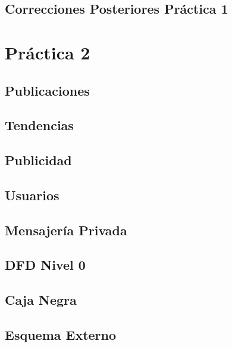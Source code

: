 \documentclass[twoside,openright,titlepage,numbers=noenddot,headinclude,footinclude=true,
cleardoublepage=empty,abstractoff,BCOR=5mm,paper=a4,fontsize=12pt,main=spanish,pdfstartpage=1]{scrreprt}
\theoremstyle{plain}
\begin{document}
% 

\chapter{Correcciones Posteriores Práctica 1}


\part{Práctica 2}

\chapter{Publicaciones}


\chapter{Tendencias}


\chapter{Publicidad}


\chapter{Usuarios}


\chapter{Mensajería Privada}


\chapter{DFD Nivel 0}


\chapter{Caja Negra}


\chapter{Esquema Externo}

\end{document}
